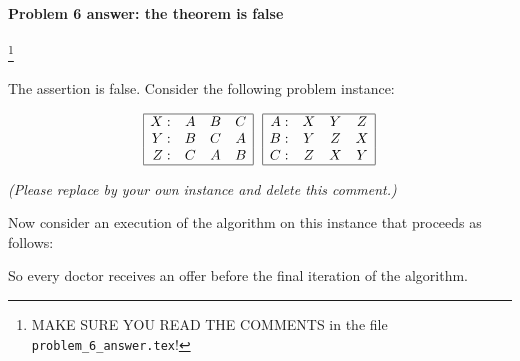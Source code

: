 


\paragraph{Problem 6 answer: the theorem is false}\footnote
{\color{red}MAKE SURE YOU READ THE COMMENTS in the file \texttt{problem\_6\_answer.tex}!}

The assertion is false.  Consider the following problem instance:

\begin{blue}                    %
  \[
    \begin{array}{|rccc|} \hline
      X: & A & B & C\\
      Y: & B & C & A\\
      Z: & C & A & B \\ \hline
    \end{array}
    ~~{}
    \begin{array}{|rccc|}\hline
      A: & X & Y & Z\\
      B: & Y & Z & X\\
      C: & Z & X & Y \\\hline
    \end{array}
  \]
  \centerline{\emph{(Please replace by your own instance and delete this comment.)}}
\end{blue}

Now consider an execution of the algorithm on this instance that proceeds as follows:

\begin{blue}
  \REPLACEME
\end{blue}

So every doctor receives an offer before the final iteration of the algorithm.




